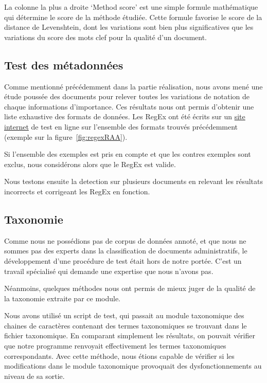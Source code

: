 La colonne la plus a droite `Method score' est une simple formule mathématique qui détermine le score de la méthode étudiée.
Cette formule favorise le score de la distance de Levenshtein, dont les variations sont bien plus significatives que les variations du score des mots clef pour la qualité d'un document.


\subsection{Test des métadonnées}
Comme mentionné précédemment dans la partie réalisation, nous avons mené une étude poussée des documents pour relever toutes les variations de notation de chaque informations d'importance.
Ces résultats nous ont permis d'obtenir une liste exhaustive des formats de données.
Les RegEx ont été écrits sur un \href{https://regex101.com/}{site internet} de test en ligne sur l'ensemble des formats trouvés précédemment (exemple sur la figure~\ref{fig:regexRAA}).

Si l'ensemble des exemples est pris en compte et que les contres exemples sont exclus, nous considérons alors que le RegEx est valide.

Nous testons ensuite la detection sur plusieurs documents en relevant les résultats incorrects et corrigeant les RegEx en fonction.


\subsection{Taxonomie}
Comme nous ne possédions pas de corpus de données annoté, et que nous ne sommes pas des experts dans la classification de documents administratifs, le développement d'une procédure de test était hors de notre portée.
C'est un travail spécialisé qui demande une expertise que nous n'avons pas.

Néanmoins, quelques méthodes nous ont permis de mieux juger de la qualité de la taxonomie extraite par ce module. 

Nous avons utilisé un script de test, qui passait au module taxonomique des chaines de caractères contenant des termes taxonomiques se trouvant dans le fichier taxonomique.
En comparant simplement les résultats, on pouvait vérifier que notre programme renvoyait effectivement les termes taxonomiques correspondants.
Avec cette méthode, nous étions capable de vérifier si les modifications dans le module taxonomique provoquait des dysfonctionnements au niveau de sa sortie. 


